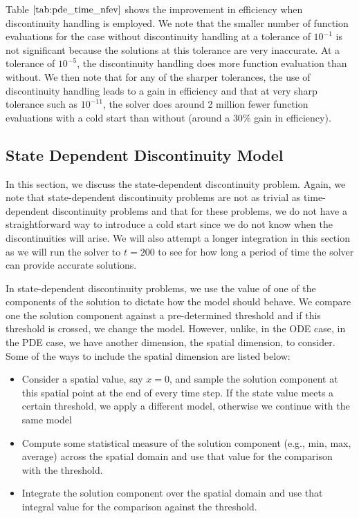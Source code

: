\documentclass{article}
\begin{document}
Table $\ref{tab:pde_time_nfev}$ shows the improvement in efficiency when discontinuity handling is employed. We note that the smaller number of function evaluations for the case without discontinuity handling at a tolerance of $10^{-1}$ is not significant because the solutions at this tolerance are very inaccurate. At a tolerance of $10^{-5}$, the discontinuity handling does more function evaluation than without. We then note that for any of the sharper tolerances, the use of discontinuity handling leads to a gain in efficiency and that at very sharp tolerance such as $10^{-11}$, the solver does around 2 million fewer function evaluations with a cold start than without (around a $30\%$ gain in efficiency). 

\subsection{State Dependent Discontinuity Model}
\label{subsection:pde_state_intro}
In this section, we discuss the state-dependent discontinuity problem. Again, we note that state-dependent discontinuity problems are not as trivial as time-dependent discontinuity problems and that for these problems, we do not have a straightforward way to introduce a cold start since we do not know when the discontinuities will arise. We will also attempt a longer integration in this section as we will run the solver to $t=200$ to see for how long a period of time the solver can provide accurate solutions.

In state-dependent discontinuity problems, we use the value of one of the components of the solution to dictate how the model should behave. We compare one the solution component against a pre-determined threshold and if this threshold is crossed, we change the model. However, unlike, in the ODE case, in the PDE case, we have another dimension, the spatial dimension, to consider. Some of the ways to include the spatial dimension are listed below:
\begin{itemize}
\item Consider a spatial value, say $x=0$, and sample the solution component at this spatial point at the end of every time step. If the state value meets a certain threshold, we apply a different model, otherwise we continue with the same model

\item Compute some statistical measure of the solution component (e.g., min, max, average) across the spatial domain and use that value for the comparison with the threshold.

\item Integrate the solution component over the spatial domain and use that integral value for the comparison against the threshold.
\end{itemize}
\end{document}
